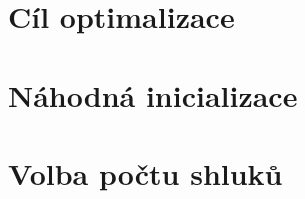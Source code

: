 \par{}
\newpage











\section{Cíl optimalizace}

\par{}
\newpage











\section{Náhodná inicializace}

\par{}
\newpage











\section{Volba počtu shluků}

\par{}
\newpage
















